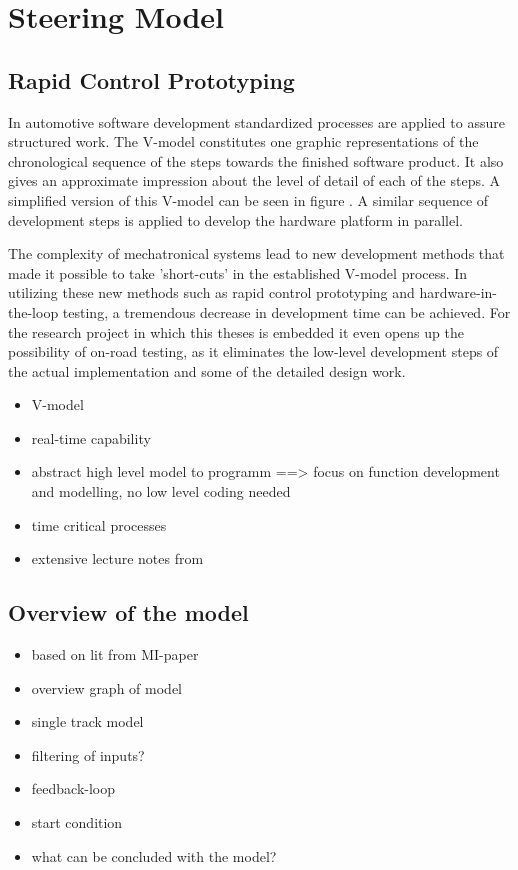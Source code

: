 \documentclass[ExampleMasters.tex]{subfiles}
\begin{document}
\clearpage
\chapter{Steering Model}
\label{chap:steering_model}

\section{Rapid Control Prototyping}
\label{sec:rapid_proto}

In automotive software development standardized processes are applied to assure structured work. The V-model constitutes one graphic representations of the chronological sequence of the steps towards the finished software product. It also gives an approximate impression about the level of detail of each of the steps. A simplified version of this V-model can be seen in figure . A similar sequence of development steps is applied to develop the hardware platform in parallel.

The complexity of mechatronical systems lead to new development methods that made it possible to take 'short-cuts' in the established V-model process. In utilizing these new methods such as rapid control prototyping and hardware-in-the-loop testing, a tremendous decrease in development time can be achieved. For the research project in which this theses is embedded it even opens up the possibility of on-road testing, as it eliminates the low-level development steps of the actual implementation and some of the detailed design work.


\begin{itemize}
	\item V-model
	\item real-time capability
	\item abstract high level model to programm ==> focus on function development and modelling, no low level coding needed
	\item time critical processes
	\item extensive lecture notes from \cite{rapidcontrolprototyping}
\end{itemize}

\section{Overview of the model}
\label{sec:overview_of_the_model}
			
\begin{itemize}
	\item based on lit from MI-paper 
	\item overview graph of model
	\item single track model
	
	\item filtering of inputs?
	\item feedback-loop
	\item start condition
	\item what can be concluded with the model?
\end{itemize}
\end{document}
